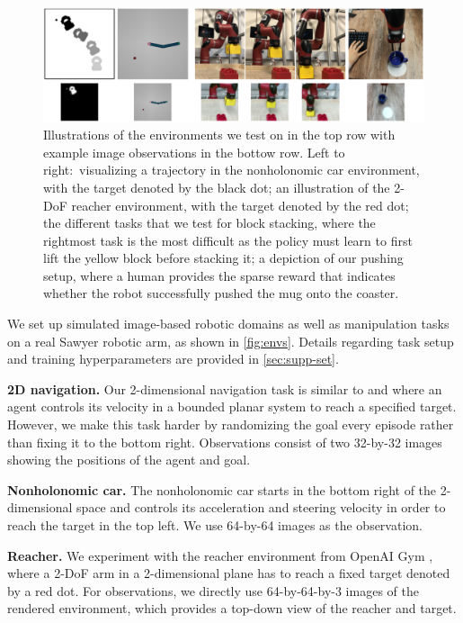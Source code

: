 \begin{figure}
    \centering
    \includegraphics[width=\linewidth]{img/solar/domains.png}
    \caption[Illustrations of the environment we evaluate our algorithm on]{Illustrations of the environments we test on in the top row with example image observations in the bottow row. Left to right:~visualizing a trajectory in the nonholonomic car environment, with the target denoted by the black dot; an illustration of the 2-DoF reacher environment, with the target denoted by the red dot; the different tasks that we test for block stacking, where the rightmost task is the most difficult as the policy must learn to first lift the yellow block before stacking it; a depiction of our pushing setup, where a human provides the sparse reward that indicates whether the robot successfully pushed the mug onto the coaster.}
    \label{fig:envs}
    \vspace{-.5em}
\end{figure}

We set up simulated image-based robotic domains as well as manipulation tasks on a real Sawyer robotic arm, as shown in \autoref{fig:envs}. Details regarding task setup and training hyperparameters are provided in \autoref{sec:supp-set}.

{\bf 2D navigation.} Our 2-dimensional navigation task is similar to \citet{e2c} and \citet{rce} where an agent controls its velocity in a bounded planar system to reach a specified target. However, we make this task harder by randomizing the goal every episode rather than fixing it to the bottom right. Observations consist of two \mbox{32-by-32} images showing the positions of the agent and goal.

{\bf Nonholonomic car.} The nonholonomic car starts in the bottom right of the 2-dimensional space and controls its acceleration and steering velocity in order to reach the target in the top left. We use \mbox{64-by-64} images as the observation.

{\bf Reacher.} We experiment with the reacher environment from OpenAI Gym \citep{gym}, where a 2-DoF arm in a 2-dimensional plane has to reach a fixed target denoted by a red dot. For observations, we directly use \mbox{64-by-64-by-3} images of the rendered environment, which provides a top-down view of the reacher and target.

